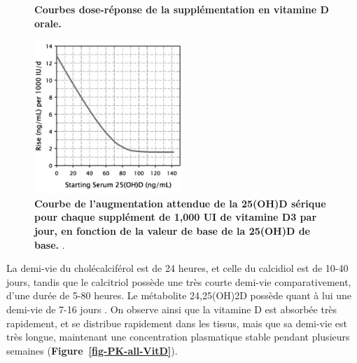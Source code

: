 \documentclass[
  a4paper,
  DIV=11,
  numbers=noendperiod,
  listof=totoc]{scrreprt}
\begin{document}
\begin{figure}
\begin{subfigure}{0.48\textwidth}
        \label{subfig:vd-dose-imc}
    \end{subfigure}
    \caption[Courbes dose-réponse de la supplémentation en vitamine D orale.]{\textbf{Courbes dose-réponse de la supplémentation en vitamine D orale.}}
    \label{fig:dose-response}
\end{figure}

\begin{figure}
\centering
\includegraphics[width=0.5\textwidth]{figures/vd-expected-rise.jpeg}
\caption[Courbe de l'augmentation attendue de la 25(OH)D sérique pour chaque supplément de 1,000 UI de vitamine D3 par jour, en fonction de la valeur de base de la 25(OH)D de base]{\textbf{Courbe de l'augmentation attendue de la 25(OH)D sérique pour chaque supplément de 1,000 UI de vitamine D3 par jour, en fonction de la valeur de base de la 25(OH)D de base.} \textcite{Garland.2011}.}
\label{fig:vd-expected-rise}
\end{figure}

La demi-vie du cholécalciférol est de 24 heures, et celle du calcidiol
est de 10-40 jours, tandis que le calcitriol possède une très courte
demi-vie comparativement, d'une durée de 5-80 heures. Le métabolite
24,25(OH)2D possède quant à lui une demi-vie de 7-16 jours
\autocite{Schoenmakers.2018}. On observe ainsi que la vitamine D est
absorbée très rapidement, et se distribue rapidement dans les tissus,
mais que sa demi-vie est très longue, maintenant une concentration
plasmatique stable pendant plusieurs semaines
(\textbf{Figure~\ref{fig-PK-all-VitD}}).
\end{document}
